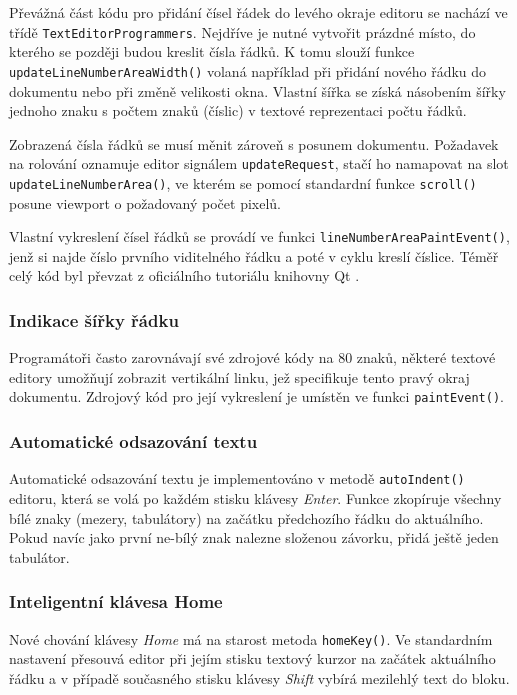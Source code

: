 \documentclass[11pt,twoside,a4paper]{book}
\begin{document}
Převážná část kódu pro přidání čísel řádek do levého okraje editoru se nachází ve třídě \texttt{TextEditorProgrammers}. Nejdříve je nutné vytvořit prázdné místo, do kterého se později budou kreslit čísla řádků. K tomu slouží funkce \texttt{updateLineNumberAreaWidth()} volaná například při přidání nového řádku do dokumentu nebo při změně velikosti okna. Vlastní šířka se získá násobením šířky jednoho znaku s počtem znaků (číslic) v textové reprezentaci počtu řádků.

Zobrazená čísla řádků se musí měnit zároveň s posunem dokumentu. Požadavek na rolování oznamuje editor signálem \texttt{updateRequest}, stačí ho namapovat na slot \texttt{up\-da\-te\-Li\-ne\-Num\-ber\-A\-re\-a()}, ve kterém se pomocí standardní funkce \texttt{scroll()} posune viewport o požadovaný počet pixelů.

Vlastní vykreslení čísel řádků se provádí ve funkci \texttt{lineNumberAreaPaintEvent()}, jenž si najde číslo prvního viditelného řádku a poté v cyklu kreslí číslice. Téměř celý kód byl převzat z oficiálního tutoriálu knihovny Qt \cite{code_editor_example}.


\subsubsection{Indikace šířky řádku}

Programátoři často zarovnávají své zdrojové kódy na 80 znaků, některé textové editory umožňují zobrazit vertikální linku, jež specifikuje tento pravý okraj dokumentu. Zdrojový kód pro její vykreslení je umístěn ve funkci \texttt{paintEvent()}.


\subsubsection{Automatické odsazování textu}

Automatické odsazování textu je implementováno v metodě \texttt{autoIndent()} editoru, která se volá po každém stisku klávesy \textit{Enter}. Funkce zkopíruje všechny bílé znaky (mezery, tabulátory) na začátku předchozího řádku do aktuálního. Pokud navíc jako první ne-bílý znak nalezne složenou závorku, přidá ještě jeden tabulátor.


\subsubsection{Inteligentní klávesa Home}

Nové chování klávesy \textit{Home} má na starost metoda \texttt{homeKey()}. Ve standardním nastavení přesouvá editor při jejím stisku textový kurzor na začátek aktuálního řádku a v případě současného stisku klávesy \textit{Shift} vybírá mezilehlý text do bloku.
\end{document}
